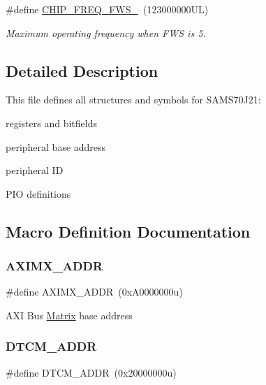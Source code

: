 \begin{DoxyCompactItemize}
\mbox{\label{group__SAMS70J21__definitions_ga3b66824f858591135877b369f98d48a5}} 
\#define \mbox{\hyperlink{group__SAMS70J21__definitions_ga3b66824f858591135877b369f98d48a5}{C\+H\+I\+P\+\_\+\+F\+R\+E\+Q\+\_\+\+F\+W\+S\+\_}}~(123000000\+U\+L)
\begin{DoxyCompactList}\small\item\em Maximum operating frequency when F\+WS is 5. \end{DoxyCompactList}\end{DoxyCompactItemize}


\subsection{Detailed Description}
This file defines all structures and symbols for S\+A\+M\+S70\+J21\+:
\begin{DoxyItemize}
\item registers and bitfields
\item peripheral base address
\item peripheral ID
\item P\+IO definitions 
\end{DoxyItemize}

\subsection{Macro Definition Documentation}
\mbox{\label{group__SAMS70J21__definitions_ga2fb7cc681bf5e7fbce5e3635b72a330a}} 
\subsubsection{\texorpdfstring{AXIMX\_ADDR}{AXIMX\_ADDR}}
{\footnotesize\ttfamily \#define A\+X\+I\+M\+X\+\_\+\+A\+D\+DR~(0x\+A0000000u)}

A\+XI Bus \mbox{\hyperlink{structMatrix}{Matrix}} base address \mbox{\label{group__SAMS70J21__definitions_ga26626a425f7ebb3a0c2dbc276f0d9f78}} 
\subsubsection{\texorpdfstring{DTCM\_ADDR}{DTCM\_ADDR}}
{\footnotesize\ttfamily \#define D\+T\+C\+M\+\_\+\+A\+D\+DR~(0x20000000u)}


